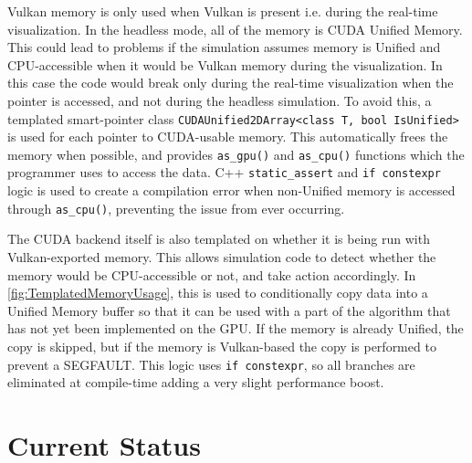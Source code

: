 Vulkan memory is only used when Vulkan is present i.e. during the real-time visualization.
In the headless mode, all of the memory is CUDA Unified Memory.
This could lead to problems if the simulation assumes memory is Unified and CPU-accessible when it would be Vulkan memory during the visualization.
In this case the code would break only during the real-time visualization when the pointer is accessed, and not during the headless simulation.
To avoid this, a templated smart-pointer class \texttt{CUDAUnified2DArray<class T, bool IsUnified>} is used for each pointer to CUDA-usable memory.
This automatically frees the memory when possible, and provides \texttt{as_gpu()} and \texttt{as_cpu()} functions which the programmer uses to access the data.
C++ \texttt{static_assert} and \texttt{if constexpr} logic is used to create a compilation error when non-Unified memory is accessed through \texttt{as_cpu()}, preventing the issue from ever occurring.


The CUDA backend itself is also templated on whether it is being run with Vulkan-exported memory.
This allows simulation code to detect whether the memory would be CPU-accessible or not, and take action accordingly.
In \cref{fig:TemplatedMemoryUsage}, this is used to conditionally copy data into a Unified Memory buffer so that it can be used with a part of the algorithm that has not yet been implemented on the GPU.
If the memory is already Unified, the copy is skipped, but if the memory is Vulkan-based the copy is performed to prevent a SEGFAULT.
This logic uses \texttt{if constexpr}, so all branches are eliminated at compile-time adding a very slight performance boost.

\section{Current Status}
\label{sec:ImplementationCurrentStatus}
